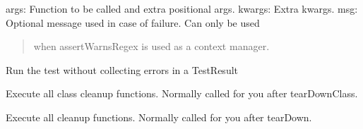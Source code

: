 \documentclass[letterpaper,10pt,english]{sphinxmanual}
\begin{document}
\begin{fulllineitems}
\begin{fulllineitems}
\begin{description}
\sphinxAtStartPar
args: Function to be called and extra positional args.
kwargs: Extra kwargs.
msg: Optional message used in case of failure. Can only be used
\begin{quote}

\sphinxAtStartPar
when assertWarnsRegex is used as a context manager.
\end{quote}

\end{description}

\end{fulllineitems}


\begin{fulllineitems}
\label{\detokenize{_autosummary/tests.test_unit.test_sqlite:tests.test_unit.test_sqlite.debug}}
\pysigstartsignatures
{}
\pysigstopsignatures
\sphinxAtStartPar
Run the test without collecting errors in a TestResult

\end{fulllineitems}


\begin{fulllineitems}
\label{\detokenize{_autosummary/tests.test_unit.test_sqlite:tests.test_unit.test_sqlite.doClassCleanups}}
\pysigstartsignatures
{}
\pysigstopsignatures
\sphinxAtStartPar
Execute all class cleanup functions. Normally called for you after
tearDownClass.

\end{fulllineitems}


\begin{fulllineitems}
\label{\detokenize{_autosummary/tests.test_unit.test_sqlite:tests.test_unit.test_sqlite.doCleanups}}
\pysigstartsignatures
{}
\pysigstopsignatures
\sphinxAtStartPar
Execute all cleanup functions. Normally called for you after
tearDown.


\end{fulllineitems}
\end{fulllineitems}
\end{document}
